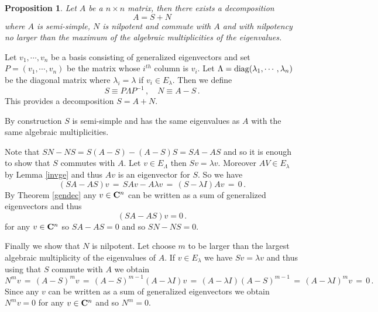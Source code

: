 \documentclass[12pt]{report}
\newcommand{\bC}{{\bf C}}
\newtheorem{prop}[theorem]{Proposition}
\newcommand{\proof}{\noindent {\em Proof:~}}
\begin{document}
\begin{prop}\label{ssndec} Let $A$ be a $n\times n$ matrix, then there exists a decomposition 
\begin{equation}
A = S + N
\end{equation}
where $A$ is semi-simple, $N$ is nilpotent  and commute with $A$ and with nilpotency 
no larger than the maximum of the algebraic multiplicities of the eigenvalues.  
\end{prop}


\proof   Let $v_1, \cdots, v_n$ be a basis consisting of generalized eigenvectors and set 
$P=(v_1, \cdots, v_n)$ be the matrix whose $i^{th}$ column is $v_i$.   
Let $\Lambda= {\rm diag}(\lambda_1, \cdots, \lambda_n)$ be the diagonal matrix where 
$\lambda_i =\lambda$ if $v_i \in E_\lambda$.  Then we define 
\begin{equation}
S \equiv P \Lambda P^{-1}\,, \quad N \equiv A-S  \,.
\end{equation}
This provides a decomposition $S=A+N$.    

By construction $S$ is semi-simple and has the same eigenvalues as $A$ with the same 
algebraic multiplicities. 


Note that $SN -NS = S(A-S) - (A-S)S = SA -AS$ and so it is enough to show that 
$S$ commutes with $A$.  
Let $v\in E_\Lambda$ then $Sv=\lambda v$. Moreover $AV \in E_\lambda$ by Lemma \ref{invge} and thus $Av$ is an eigenvector for $S$.  So we have 
\begin{equation}
(SA - AS) v \,=\, SA v - A\lambda v \,=\, (S - \lambda I) Av \,=\,0 \,.
\end{equation}
By Theorem \ref{gendec} any $v\in \bC^n$ can be written as a sum of generalized eigenvectors 
and thus
\begin{equation}
(SA-AS)v=0 \,.
\end{equation}
for any $v \in \bC^n$ so $SA-AS=0$ and so $SN-NS=0$. 

Finally we show that $N$ is nilpotent. Let choose $m$ to be larger than the largest 
algebraic multiplicity of the eigenvalues of $A$.   If $v\in E_\lambda$ we have $Sv=\lambda v$
and thus using that $S$ commute with $A$ we obtain
\begin{equation}
N^m v \,=\, (A-S)^m v \,=\, (A-S)^{m-1} (A - \lambda I)v \,=\, (A - \lambda I)(A-S)^{m-1}\,=\,
(A-\lambda I)^m v \,=\,0\,.
\end{equation}
Since any $v$ can be written as a sum of generalized eigenvectors we obtain 
$N^m v =0$ for any $v \in \bC^n$ and so $N^m=0$.  
\end{document}
